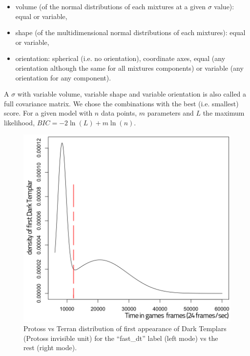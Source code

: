\begin{itemize}
    \item volume (of the normal distributions of each mixtures at a given $\sigma$ value): equal or variable,
    \item shape (of the multidimensional normal distributions of each mixtures): equal or variable, 
    \item orientation: spherical (i.e. no orientation), coordinate axes, equal (any orientation although the same for all mixtures components) or variable (any orientation for any component).
\end{itemize}
A $\sigma$ with variable volume, variable shape and variable orientation is also called a full covariance matrix. We chose the combinations with the best (i.e. smallest)  score. For a given model with $n$ data points, $m$ parameters and $L$ the maximum likelihood, $BIC= -2 \ln(L) + m \ln(n)$. 

\begin{figure}[hp]
\centerline{\includegraphics[width=0.56\columnwidth]{images/PvTfastDT.png}}
\caption{Protoss vs Terran distribution of first appearance of Dark Templars (Protoss invisible unit) for the ``fast\_dt'' label (left mode) vs the rest (right mode).}
\label{PvTfastDT}
\end{figure}

